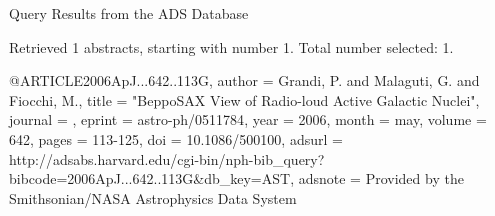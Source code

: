 Query Results from the ADS Database


Retrieved 1 abstracts, starting with number 1.  Total number selected: 1.

@ARTICLE{2006ApJ...642..113G,
   author = {{Grandi}, P. and {Malaguti}, G. and {Fiocchi}, M.},
    title = "{BeppoSAX View of Radio-loud Active Galactic Nuclei}",
  journal = {\apj},
   eprint = {astro-ph/0511784},
     year = 2006,
    month = may,
   volume = 642,
    pages = {113-125},
      doi = {10.1086/500100},
   adsurl = {http://adsabs.harvard.edu/cgi-bin/nph-bib_query?bibcode=2006ApJ...642..113G&db_key=AST},
  adsnote = {Provided by the Smithsonian/NASA Astrophysics Data System}
}


